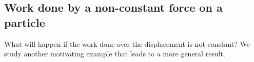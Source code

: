 \documentclass{ximera}
\begin{document}

\subsection{Work done by a non-constant force on a particle}

What will happen if the work done over the displacement is not constant?  We study another motivating example that leads to a more general result.
\end{document}
